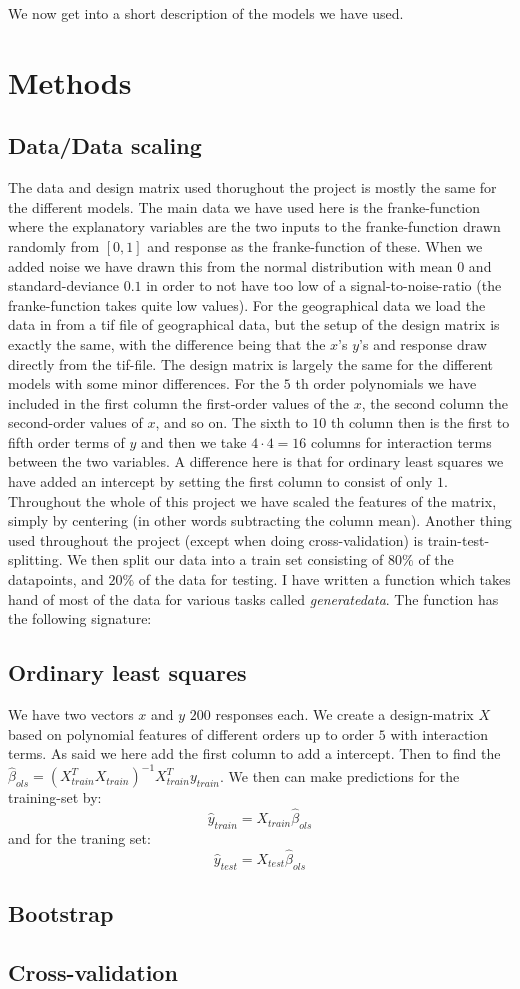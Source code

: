 \documentclass{article}
\begin{document}
We now get into a short description of the models we have used.

\section{Methods}
\subsection{Data/Data scaling}
The data and design matrix used thorughout the project is mostly the same for
the different models. The main data we have used here is the franke-function
where the explanatory variables are the two inputs to the franke-function drawn
randomly from $\left[ 0, 1 \right]$ and response as the franke-function of
these. When we added noise we have drawn this from the normal distribution with
mean $0$ and standard-deviance $0.1$ in order to not have too low of a
signal-to-noise-ratio (the franke-function takes quite low values). For the
geographical data we load the data in from a tif file of geographical data, but
the setup of the design matrix is exactly the same, with the difference being
that the $x$'s $y$'s and response draw directly from the tif-file. The design
matrix is largely the same for the different models with some minor differences.
For the $5$ th order polynomials we have included in the first column the
first-order values of the $x$, the second column the second-order values of $x$,
and so on. The sixth to $10$ th column then is the first to fifth order terms of
$y$ and then we take $4 \cdot 4 = 16$ columns for interaction terms between the
two variables. A difference here is that for ordinary least squares we have
added an intercept by setting the first column to consist of only $1$.
Throughout the whole of this project we have scaled the features of the matrix,
simply by centering (in other words subtracting the column mean). Another thing
used throughout the project (except when doing cross-validation) is
train-test-splitting. We then split our data into a train set consisting of
$80\%$ of the datapoints, and $20\%$ of the data for testing. I have written a
function which takes hand of most of the data for various tasks called
\textit{generatedata}. The function has the following signature:

\subsection{Ordinary least squares}
We have two vectors $x$ and $y$ $200$ responses each. We create a design-matrix
$X$ based on polynomial features of different orders up to order $5$ with
interaction terms. As said we here add the first column to add a intercept. Then
to find the $\hat{\beta}_{ols} = (X^T_{train} X_{train})^{-1} X^T_{train}
y_{train}$. We then can make predictions for the training-set by:
$$\hat{y}_{train} = X_{train} \hat{\beta}_{ols}$$
and for the traning set:
$$\hat{y}_{test} = X_{test} \hat{\beta}_{ols}$$

\subsection{Bootstrap}

\subsection{Cross-validation}


\end{document}
